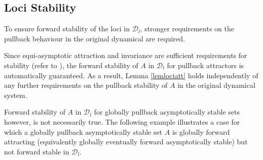 \subsection{Loci Stability}

To ensure forward stability of the loci in $\mathcal{D}_l$, stronger
requirements on the pullback behaviour in the original dynamical are required.

Since equi-asymptotic attraction and invariance are sufficient
requirements for stability (refer to \cite{BhSz67}), the forward
stability of $A$ in $\mathcal{D}_l$ for pullback attractors is
automatically guaranteed. As a result, Lemma \ref{lemlociatt}
holds independently of any further requirements on the pullback
stability of $A$ in the original dynamical system.

Forward stability of $A$ in $\mathcal{D}_l$ for globally pullback asymptotically
stable sets however, is not necessarily true. The following example illustrates
a case for which a globally pullback asymptotically stable set $A$ is globally
forward attracting (equivalently globally eventually forward asymptotically
stable) but not forward stable in $\mathcal{D}_l$.

